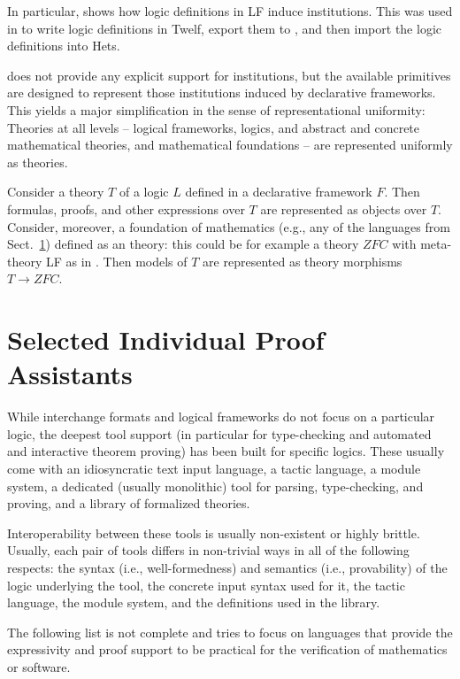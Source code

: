 \documentclass[12pt]{article}
\begin{document}
In particular, \cite{rabe:combining:10} shows how logic definitions in LF induce institutions.
This was used in \cite{CHKMRS:lfhets:11} to write logic definitions in Twelf, export them to \mmt, and then import the logic definitions into Hets.

\mmt does not provide any explicit support for institutions, but the available primitives are designed to represent those institutions induced by declarative frameworks.
This yields a major simplification in the sense of representational uniformity: Theories at all levels -- logical frameworks, logics, and abstract and  concrete mathematical theories, and mathematical foundations -- are represented uniformly as \mmt theories.

Consider a theory $T$ of a logic $L$ defined in a declarative framework $F$.
Then formulas, proofs, and other expressions over $T$ are represented as \mmt objects over $T$.
Consider, moreover, a foundation of mathematics (e.g., any of the languages from Sect.~\ref{sec:foundations}) defined as an \mmt theory: this could be for example a theory $ZFC$ with meta-theory LF as in \cite{IR:foundations-lf:10}.
Then models of $T$ are represented as \mmt theory morphisms $T\to ZFC$.

\section{Selected Individual Proof Assistants}\label{sec:foundations}

While interchange formats and logical frameworks do not focus on a particular logic, the deepest tool support (in particular for type-checking and automated and interactive theorem proving) has been built for specific logics.
These usually come with an idiosyncratic text input language, a tactic language, a module system, a dedicated (usually monolithic) tool for parsing, type-checking, and proving, and a library of formalized theories.

Interoperability between these tools is usually non-existent or highly brittle.
Usually, each pair of tools differs in non-trivial ways in all of the following respects: the syntax (i.e., well-formedness) and semantics (i.e., provability) of the logic underlying the tool, the concrete input syntax used for it, the tactic language, the module system, and the definitions used in the library.

The following list is not complete and tries to focus on languages that provide the expressivity and proof support to be practical for the verification of mathematics or software.
\end{document}
